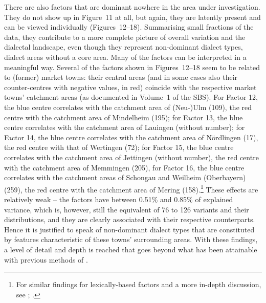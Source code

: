\documentclass[output=paper]{LSP/langsci}
\begin{document}
There are also factors that are dominant nowhere in the area under investigation. They do not show up in Figure~11 at all, but again, they are latently present and can be viewed individually (Figures~12–18). Summarising small fractions of the data, they contribute to a more complete picture of overall variation and the dialectal landscape, even though they represent non-dominant dialect types, dialect areas without a core area. Many of the factors can be interpreted in a meaningful way. Several of the factors shown in Figures~12–18 seem to be related to (former) market towns: their central areas (and in some cases also their counter-centres with negative values, in red) coincide with the respective market towns’ catchment areas (as documented in Volume~1 of the SBS). For Factor 12, the blue centre correlates with the catchment area of (Neu-)Ulm (109), the red centre with the catchment area of Mindelheim (195); for Factor 13, the blue centre correlates with the catchment area of Lauingen (without number); for Factor 14, the blue centre correlates with the catchment area of Nördlingen (17), the red centre with that of Wertingen (72); for Factor 15, the blue centre correlates with the catchment area of Jettingen (without number), the red centre with the catchment area of Memmingen (205), for Factor 16, the blue centre correlates with the catchment areas of Schongau and Weilheim (Oberbayern) (259), the red centre with the catchment area of Mering (158).\footnote{For similar findings for lexically-based factors and a more in-depth discussion, see \citet[170--196]{pickl_probabilistische_2013}; \citet{buhler_dialektraume_2014}.} These effects are relatively weak – the factors have between 0.51\% and 0.85\% of explained variance, which is, however, still the equivalent of 76 to 126 variants and their distributions, and they are clearly associated with their respective counterparts. Hence it is justified to speak of non-dominant dialect types that are constituted by features characteristic of these towns’ surrounding areas. With these findings, a level of detail and depth is reached that goes beyond what has been attainable with previous methods of .
\end{document}
